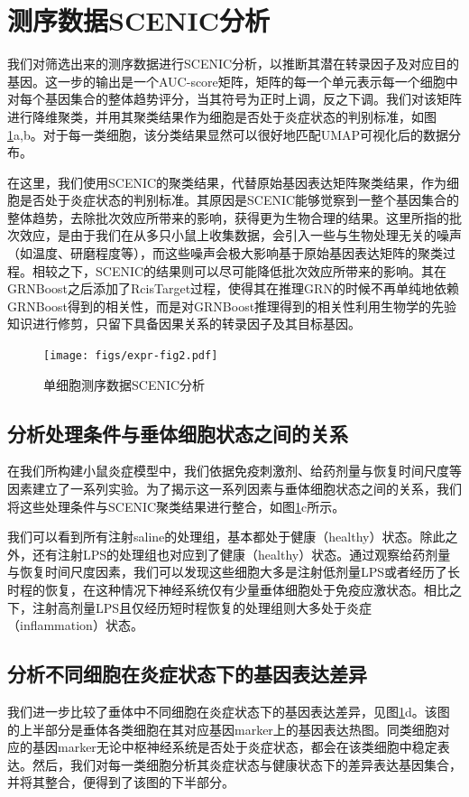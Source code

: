 \section{测序数据SCENIC分析}
  我们对筛选出来的测序数据进行SCENIC分析，以推断其潜在转录因子及对应目的基因。这一步的输出是一个AUC-score矩阵，矩阵的每一个单元表示每一个细胞中对每个基因集合的整体趋势评分，当其符号为正时上调，反之下调。我们对该矩阵进行降维聚类，并用其聚类结果作为细胞是否处于炎症状态的判别标准，如图\ref{fig:expr-fig2}a,b。对于每一类细胞，该分类结果显然可以很好地匹配UMAP可视化后的数据分布。

  在这里，我们使用SCENIC的聚类结果，代替原始基因表达矩阵聚类结果，作为细胞是否处于炎症状态的判别标准。其原因是SCENIC能够觉察到一整个基因集合的整体趋势，去除批次效应所带来的影响，获得更为生物合理的结果。这里所指的批次效应，是由于我们在从多只小鼠上收集数据，会引入一些与生物处理无关的噪声（如温度、研磨程度等），而这些噪声会极大影响基于原始基因表达矩阵的聚类过程。相较之下，SCENIC的结果则可以尽可能降低批次效应所带来的影响。其在GRNBoost之后添加了RcisTarget过程，使得其在推理GRN的时候不再单纯地依赖GRNBoost得到的相关性，而是对GRNBoost推理得到的相关性利用生物学的先验知识进行修剪，只留下具备因果关系的转录因子及其目标基因。

\begin{figure}[!htb]
  \centering
  \texttt{[image: figs/expr-fig2.pdf]}
  \caption{单细胞测序数据SCENIC分析}
  \label{fig:expr-fig2}
\end{figure}

\subsection{分析处理条件与垂体细胞状态之间的关系}
  在我们所构建小鼠炎症模型中，我们依据免疫刺激剂、给药剂量与恢复时间尺度等因素建立了一系列实验。为了揭示这一系列因素与垂体细胞状态之间的关系，我们将这些处理条件与SCENIC聚类结果进行整合，如图\ref{fig:expr-fig2}c所示。

  我们可以看到所有注射saline的处理组，基本都处于健康（healthy）状态。除此之外，还有注射LPS的处理组也对应到了健康（healthy）状态。通过观察给药剂量与恢复时间尺度因素，我们可以发现这些细胞大多是注射低剂量LPS或者经历了长时程的恢复，在这种情况下神经系统仅有少量垂体细胞处于免疫应激状态。相比之下，注射高剂量LPS且仅经历短时程恢复的处理组则大多处于炎症（inflammation）状态。

\subsection{分析不同细胞在炎症状态下的基因表达差异}
  我们进一步比较了垂体中不同细胞在炎症状态下的基因表达差异，见图\ref{fig:expr-fig2}d。该图的上半部分是垂体各类细胞在其对应基因marker上的基因表达热图。同类细胞对应的基因marker无论中枢神经系统是否处于炎症状态，都会在该类细胞中稳定表达。然后，我们对每一类细胞分析其炎症状态与健康状态下的差异表达基因集合，并将其整合，便得到了该图的下半部分。

